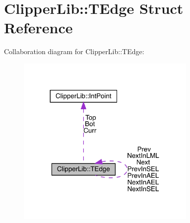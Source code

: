 \hypertarget{struct_clipper_lib_1_1_t_edge}{}\section{Clipper\+Lib\+::T\+Edge Struct Reference}
\label{struct_clipper_lib_1_1_t_edge}


Collaboration diagram for Clipper\+Lib\+::T\+Edge\+:
\nopagebreak
\begin{figure}[H]
\begin{center}
\leavevmode
\includegraphics[width=245pt]{struct_clipper_lib_1_1_t_edge__coll__graph}
\end{center}
\end{figure}
